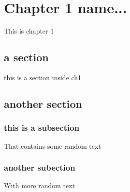 \chapter{Chapter 1 name...}

This is chapter 1

\newpage
\section{a section}

this is a section inside ch1

\newpage
\section{another section}

\subsection{this is a subsection}

That contains some random text

\subsection{another subection}

With more random text

